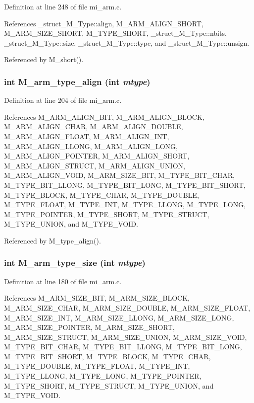 Definition at line 248 of file mi\_\-arm.c.

References \_\-struct\_\-M\_\-Type::align, M\_\-ARM\_\-ALIGN\_\-SHORT, M\_\-ARM\_\-SIZE\_\-SHORT, M\_\-TYPE\_\-SHORT, \_\-struct\_\-M\_\-Type::nbits, \_\-struct\_\-M\_\-Type::size, \_\-struct\_\-M\_\-Type::type, and \_\-struct\_\-M\_\-Type::unsign.

Referenced by M\_\-short().
\subsubsection{\setlength{\rightskip}{0pt plus 5cm}int M\_\-arm\_\-type\_\-align (int {\em mtype})}\label{mi__arm_8c_dc3556a0bdbdd20965867036bbe7204a}




Definition at line 204 of file mi\_\-arm.c.

References M\_\-ARM\_\-ALIGN\_\-BIT, M\_\-ARM\_\-ALIGN\_\-BLOCK, M\_\-ARM\_\-ALIGN\_\-CHAR, M\_\-ARM\_\-ALIGN\_\-DOUBLE, M\_\-ARM\_\-ALIGN\_\-FLOAT, M\_\-ARM\_\-ALIGN\_\-INT, M\_\-ARM\_\-ALIGN\_\-LLONG, M\_\-ARM\_\-ALIGN\_\-LONG, M\_\-ARM\_\-ALIGN\_\-POINTER, M\_\-ARM\_\-ALIGN\_\-SHORT, M\_\-ARM\_\-ALIGN\_\-STRUCT, M\_\-ARM\_\-ALIGN\_\-UNION, M\_\-ARM\_\-ALIGN\_\-VOID, M\_\-ARM\_\-SIZE\_\-BIT, M\_\-TYPE\_\-BIT\_\-CHAR, M\_\-TYPE\_\-BIT\_\-LLONG, M\_\-TYPE\_\-BIT\_\-LONG, M\_\-TYPE\_\-BIT\_\-SHORT, M\_\-TYPE\_\-BLOCK, M\_\-TYPE\_\-CHAR, M\_\-TYPE\_\-DOUBLE, M\_\-TYPE\_\-FLOAT, M\_\-TYPE\_\-INT, M\_\-TYPE\_\-LLONG, M\_\-TYPE\_\-LONG, M\_\-TYPE\_\-POINTER, M\_\-TYPE\_\-SHORT, M\_\-TYPE\_\-STRUCT, M\_\-TYPE\_\-UNION, and M\_\-TYPE\_\-VOID.

Referenced by M\_\-type\_\-align().
\subsubsection{\setlength{\rightskip}{0pt plus 5cm}int M\_\-arm\_\-type\_\-size (int {\em mtype})}\label{mi__arm_8c_641c221c693874cea281eb1f49bd75ec}




Definition at line 180 of file mi\_\-arm.c.

References M\_\-ARM\_\-SIZE\_\-BIT, M\_\-ARM\_\-SIZE\_\-BLOCK, M\_\-ARM\_\-SIZE\_\-CHAR, M\_\-ARM\_\-SIZE\_\-DOUBLE, M\_\-ARM\_\-SIZE\_\-FLOAT, M\_\-ARM\_\-SIZE\_\-INT, M\_\-ARM\_\-SIZE\_\-LLONG, M\_\-ARM\_\-SIZE\_\-LONG, M\_\-ARM\_\-SIZE\_\-POINTER, M\_\-ARM\_\-SIZE\_\-SHORT, M\_\-ARM\_\-SIZE\_\-STRUCT, M\_\-ARM\_\-SIZE\_\-UNION, M\_\-ARM\_\-SIZE\_\-VOID, M\_\-TYPE\_\-BIT\_\-CHAR, M\_\-TYPE\_\-BIT\_\-LLONG, M\_\-TYPE\_\-BIT\_\-LONG, M\_\-TYPE\_\-BIT\_\-SHORT, M\_\-TYPE\_\-BLOCK, M\_\-TYPE\_\-CHAR, M\_\-TYPE\_\-DOUBLE, M\_\-TYPE\_\-FLOAT, M\_\-TYPE\_\-INT, M\_\-TYPE\_\-LLONG, M\_\-TYPE\_\-LONG, M\_\-TYPE\_\-POINTER, M\_\-TYPE\_\-SHORT, M\_\-TYPE\_\-STRUCT, M\_\-TYPE\_\-UNION, and M\_\-TYPE\_\-VOID.

